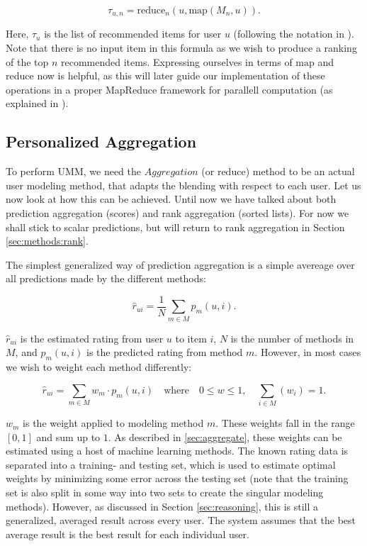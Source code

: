 \begin{equation*}
  \tau_{u,n} = \mathrm{reduce}_{n}(u, \mathrm{map}(M_{n},u)).
\end{equation*}

Here, $\tau_{u}$ is the list of recommended items for user $u$ (following the notation in \citet[p3]{Dwork2001}).
Note that there is no input item in this formula as we wish to produce a ranking of the top $n$ recommended items.
Expressing ourselves in terms of $\mathrm{map}$ and $\mathrm{reduce}$ now is helpful, as this will later
guide our implementation of these operations in a proper MapReduce framework
for parallell computation (as explained in \citet[p75]{Manning2008}).


\subsection{Personalized Aggregation}

To perform UMM, we need the $Aggregation$ (or $\mathrm{reduce}$) method to be an actual user modeling method,
that adapts the blending with respect to each user.
Let us now look at how this can be achieved.
Until now we have talked about both prediction aggregation (scores) and rank aggregation (sorted lists).
For now we shall stick to scalar predictions, but will return to rank aggregation in Section \ref{sec:methods:rank}.

The simplest generalized way of prediction aggregation is a simple avereage over all predictions made
by the different methods:

\begin{equation*}
  \hat{r}_{ui} = \frac{1}{N} \sum_{m \in M} p_m(u,i).
\end{equation*}

$\hat{r}_{ui}$ is the estimated rating from user $u$ to item $i$,
$N$ is the number of methods in $M$, and $p_m(u,i)$ is the predicted rating from method $m$.
However, in most cases we wish to weight each method differently:

\begin{equation*}
  \hat{r}_{ui} = \sum_{m \in M} w_{m} \cdot p_m(u,i) \quad \text{where} \quad 0 \leq w \leq 1, \quad \sum_{i \in M} (w_i) = 1.
\end{equation*}

$w_m$ is the weight applied to modeling method $m$. These weights fall in the range $[0,1]$ and sum up to $1$.
As described in \ref{sec:aggregate}, these weights can be estimated using a host of machine learning methods.
The known rating data is separated into a training- and testing set, which is used to estimate optimal weights
by minimizing some error across the testing set 
(note that the training set is also split in some way into two sets to create the singular modeling methods).
However, as discussed in Section \ref{sec:reasoning},
this is still a generalized, averaged result across every user. 
The system assumes that the best average result is the best result for each individual user.

